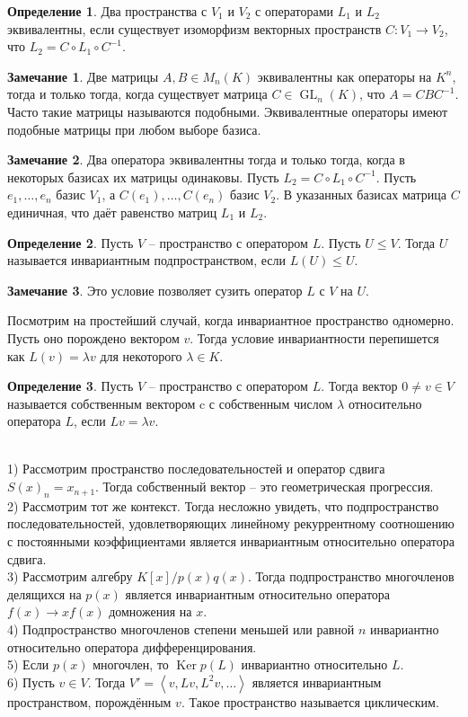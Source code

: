 \documentclass[10pt,a4paper,oneside]{book} %
\theoremstyle{definition}
\newtheorem*{rem}{Замечание}
\newtheorem*{defn}{Определение}
\DeclareMathOperator{\Ker}{Ker}
\newcommand{\GL}{\operatorname{GL}}
\def\exm{\noindent {\bf Примеры:}}
\def\lan{\left\langle }
\def\ran{\right\rangle}
\def\dfn{\begin{defn}}
\def\edfn{\end{defn}}
\def\rm{\begin{rem}}
\def\erm{\end{rem}}
\begin{document}
\dfn Два пространства с $V_1$ и $V_2$ с операторами $L_1$ и $L_2$ эквивалентны, если существует изоморфизм векторных пространств $C \colon V_1 \to V_2$, что $L_2=C \circ L_1 \circ C^{-1}$.
\edfn


\rm Две матрицы $A, B \in M_n(K)$ эквивалентны как операторы на $K^n$, тогда и только тогда, когда существует матрица $C \in \GL_n(K)$, что $A=CBC^{-1}$. Часто такие матрицы называются подобными. Эквивалентные операторы имеют подобные матрицы при любом выборе базиса.
\erm

\rm Два оператора эквивалентны тогда и только тогда, когда в некоторых базисах их матрицы одинаковы.
\proof Пусть $L_2=C \circ L_1 \circ C^{-1}$. Пусть $e_1,\dots,e_n$ базис $V_1$, а $C(e_1),\dots,C(e_n)$ базис $V_2$. В указанных базисах матрица $C$ единичная, что даёт равенство матриц $L_1$ и $L_2$.
\endproof
\erm


\dfn Пусть $V$ -- пространство с оператором $L$. Пусть $U\leq V$. Тогда $U$ называется инвариантным подпространством, если $L(U) \leq U$.
\edfn

\rm Это условие позволяет сузить оператор $L$ с $V$ на $U$.
\erm

Посмотрим на простейший случай, когда инвариантное пространство одномерно. Пусть оно порождено вектором $v$. Тогда условие инвариантности перепишется как $L(v) = \lambda v$ для некоторого $\lambda \in K$.


\dfn Пусть $V$ -- пространство с оператором $L$. Тогда вектор $0\neq v\in V$ называется собственным вектором c с собственным числом $\lambda$ относительно оператора $L$, если $Lv=\lambda v$.
\edfn

\exm \\
1) Рассмотрим пространство  последовательностей и оператор сдвига $S(x)_n= x_{n+1}$. Тогда собственный вектор -- это геометрическая прогрессия.\\
2) Рассмотрим тот же контекст. Тогда несложно увидеть, что подпространство последовательностей, удовлетворяющих линейному рекуррентному соотношению с постоянными коэффициентами является инвариантным относительно оператора сдвига.\\
3) Рассмотрим алгебру $K[x]/p(x)q(x)$. Тогда подпространство многочленов делящихся на $p(x)$ является инвариантным относительно оператора $f(x) \to x f(x)$ домножения на $x$.\\
4) Подпространство многочленов степени меньшей или равной $n$ инвариантно относительно оператора дифференцирования.\\
5) Если $p(x)$ многочлен, то $\Ker p(L)$ инвариантно относительно $L$.\\
6) Пусть $v \in V$. Тогда  $V'=\lan v, Lv, L^2v,\dots \ran$ является инвариантным пространством, порождённым $v$. Такое пространство называется циклическим.\\
\end{document}
